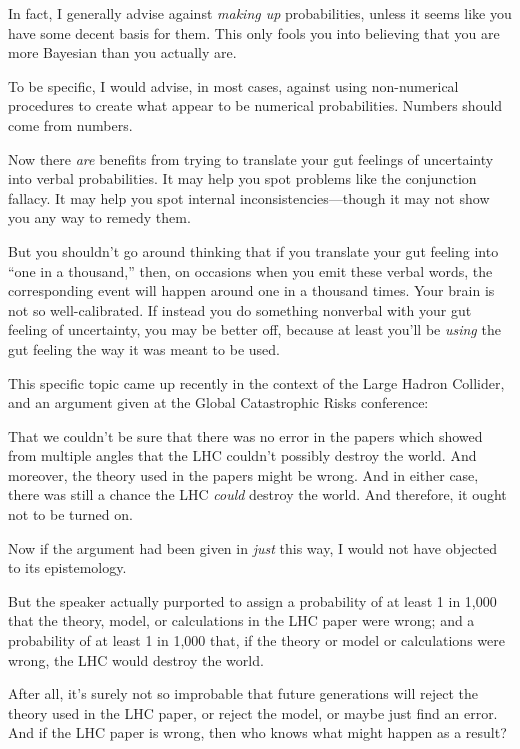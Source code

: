 {
 In fact, I generally advise against \textit{making up}
probabilities, unless it seems like you have some decent basis for
them. This only fools you into believing that you are more Bayesian
than you actually are.}

{
 To be specific, I would advise, in most cases, against using
non-numerical procedures to create what appear to be numerical
probabilities. Numbers should come from numbers.}

{
 Now there \textit{are} benefits from trying to translate your gut
feelings of uncertainty into verbal probabilities. It may help you spot
problems like the conjunction fallacy. It may help you spot internal
inconsistencies---though it may not show you any way to remedy them.}

{
 But you shouldn't go around thinking that if you
translate your gut feeling into ``one in a
thousand,'' then, on occasions when you emit these
verbal words, the corresponding event will happen around one in a
thousand times. Your brain is not so well-calibrated. If instead you do
something nonverbal with your gut feeling of uncertainty, you may be
better off, because at least you'll be \textit{using}
the gut feeling the way it was meant to be used.}

{
 This specific topic came up recently in the context of the Large
Hadron Collider, and an argument given at the Global Catastrophic Risks
conference:}

{
 That we couldn't be sure that there was no error
in the papers which showed from multiple angles that the LHC
couldn't possibly destroy the world. And moreover, the
theory used in the papers might be wrong. And in either case, there was
still a chance the LHC \textit{could} destroy the world. And therefore,
it ought not to be turned on.}

{
 Now if the argument had been given in \textit{just} this way, I
would not have objected to its epistemology.}

{
 But the speaker actually purported to assign a probability of at
least 1 in 1,000 that the theory, model, or calculations in the LHC
paper were wrong; and a probability of at least 1 in 1,000 that, if the
theory or model or calculations were wrong, the LHC would destroy the
world.}

{
 After all, it's surely not so improbable that
future generations will reject the theory used in the LHC paper, or
reject the model, or maybe just find an error. And if the LHC paper is
wrong, then who knows what might happen as a result?}

